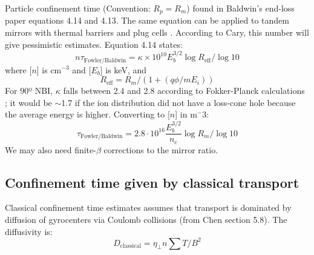Particle confinement time (Convention: $R_p = R_m$) found in Baldwin's end-loss paper \cite{baldwin_end-loss_1977} equations 4.14 and 4.13. The same equation can be applied to tandem mirrors with thermal barriers and plug cells \cite{PhysRevLett.43.1318}. According to Cary, this number will give pessimistic estimates.
Equation 4.14 \cite{baldwin_end-loss_1977} states:
\begin{equation}
     n\tau_{\text{Fowler/Baldwin}} = \kappa \times 10^{10} {E_b^{3/2}} \log{R_{\text{eff}}} / \log{10}
\end{equation}
where [$n$] is cm$^{-3}$ and [$E_b$] is keV, and
\begin{equation}
    R_{\text{eff}} = R_m / \left( 1 + (q \phi / m E_i) \right)
\end{equation}
For $90$º NBI, $\kappa$ falls between 2.4 and 2.8 according to Fokker-Planck calculations \cite{baldwin_end-loss_1977}; it would be $\sim$1.7 if the ion distribution did not have a loss-cone hole because the average energy is higher. 
Converting to [$n$] in m${^-3}$:
\begin{equation}
    \tau_{\text{Fowler/Baldwin}} = 2.8 \cdot 10^{16} \frac{E_b^{3/2}}{n_e} \log R_m / \log{10}
\end{equation}
We may also need finite-$\beta$ corrections to the mirror ratio.

\subsection{Confinement time given by classical transport}
Classical confinement time estimates assumes that transport is dominated by diffusion of gyrocenters via Coulomb collisions (from Chen section 5.8\cite{Chen_3rd_ed}). The diffusivity is:
\begin{equation}
    D_\text{classical} = \eta_\perp n \sum T / B^2
\end{equation}

